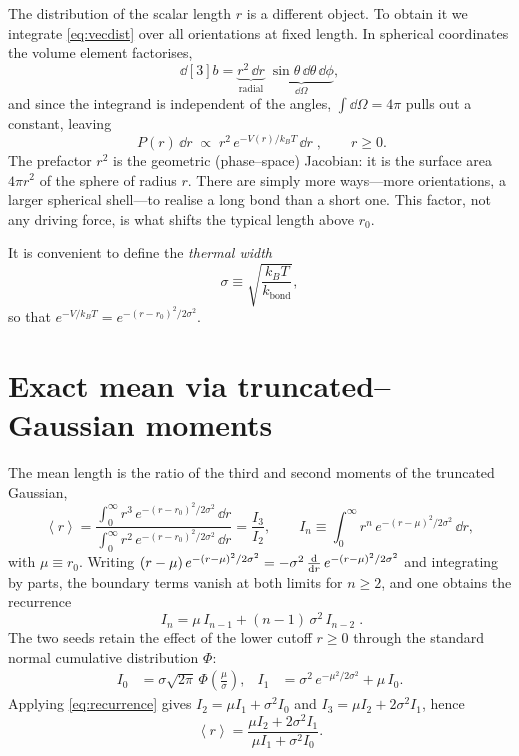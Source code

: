 \documentclass[11pt]{article}
\newcommand{\kT}{k_{B}T}
\newcommand{\kbond}{k_{\mathrm{bond}}}
\newcommand{\rzero}{r_{0}}
\newcommand{\avg}[1]{\left\langle #1 \right\rangle}
\begin{document}
The distribution of the scalar length $r$ is a different object. To obtain it we
integrate \eqref{eq:vecdist} over all orientations at fixed length. In spherical
coordinates the volume element factorises,
\begin{equation}
  \dd[3]{b}=\underbrace{r^{2}\,\dd{r}}_{\text{radial}}\;
            \underbrace{\sin\theta\,\dd{\theta}\,\dd{\phi}}_{\dd{\Omega}},
\end{equation}
and since the integrand is independent of the angles, $\int \dd{\Omega}=4\pi$ pulls
out a constant, leaving
\begin{equation}
  \boxed{\;P(r)\,\dd{r}\;\propto\; r^{2}\,e^{-V(r)/\kT}\,\dd{r}\;,\qquad r\ge 0.}
  \label{eq:lendist}
\end{equation}
The prefactor $r^{2}$ is the geometric (phase--space) Jacobian: it is the surface
area $4\pi r^{2}$ of the sphere of radius $r$. There are simply more ways---more
orientations, a larger spherical shell---to realise a long bond than a short one.
This factor, not any driving force, is what shifts the typical length above
$\rzero$.

It is convenient to define the \emph{thermal width}
\begin{equation}
  \sigma \equiv \sqrt{\frac{\kT}{\kbond}},
\end{equation}
so that $e^{-V/\kT}=e^{-(r-\rzero)^{2}/2\sigma^{2}}$.

\section{Exact mean via truncated--Gaussian moments}

The mean length is the ratio of the third and second moments of the truncated
Gaussian,
\begin{equation}
  \avg{r}=\frac{\displaystyle\int_{0}^{\infty} r^{3}\,
                e^{-(r-\rzero)^{2}/2\sigma^{2}}\,\dd{r}}
              {\displaystyle\int_{0}^{\infty} r^{2}\,
                e^{-(r-\rzero)^{2}/2\sigma^{2}}\,\dd{r}}
        =\frac{I_{3}}{I_{2}},
  \qquad
  I_{n}\equiv\int_{0}^{\infty} r^{n}\,e^{-(r-\mu)^{2}/2\sigma^{2}}\,\dd{r},
\end{equation}
with $\mu\equiv\rzero$. Writing
$(r-\mu)\,e^{-(r-\mu)^{2}/2\sigma^{2}}=-\sigma^{2}\,\dv{r}\,e^{-(r-\mu)^{2}/2\sigma^{2}}$
and integrating by parts, the boundary terms vanish at both limits for $n\ge 2$, and
one obtains the recurrence
\begin{equation}
  \boxed{\;I_{n}=\mu\,I_{n-1}+(n-1)\,\sigma^{2}\,I_{n-2}\;.}
  \label{eq:recurrence}
\end{equation}
The two seeds retain the effect of the lower cutoff $r\ge 0$ through the standard
normal cumulative distribution $\Phi$:
\begin{align}
  I_{0}&=\sigma\sqrt{2\pi}\,\Phi\!\left(\frac{\mu}{\sigma}\right),
  &
  I_{1}&=\sigma^{2}\,e^{-\mu^{2}/2\sigma^{2}}+\mu\,I_{0}.
\end{align}
Applying \eqref{eq:recurrence} gives
$I_{2}=\mu I_{1}+\sigma^{2}I_{0}$ and $I_{3}=\mu I_{2}+2\sigma^{2}I_{1}$, hence
\begin{equation}
  \avg{r}=\frac{\mu I_{2}+2\sigma^{2}I_{1}}{\mu I_{1}+\sigma^{2}I_{0}}.
\end{equation}
\end{document}
